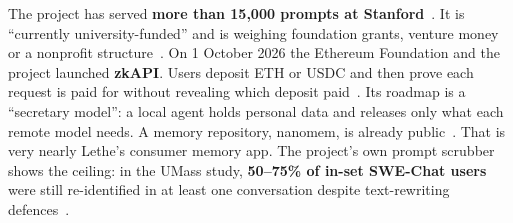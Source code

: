 \documentclass[10pt,a4paper]{article}
\begin{document}
The project has served \textbf{more than 15,000 prompts at Stanford}~\cite{ken-liu-on-x}. It is ``currently university-funded'' and is weighing foundation grants, venture money or a nonprofit structure~\cite{brave-technologist-podcast}. On 1 October 2026 the Ethereum Foundation and the project launched \textbf{zkAPI}. Users deposit ETH or USDC and then prove each request is paid for without revealing which deposit paid~\cite{the-block-zkapi-launch}. Its roadmap is a ``secretary model'': a local agent holds personal data and releases only what each remote model needs. A memory repository, nanomem, is already public~\cite{brave-technologist-podcast,openanonymity-on-github}. That is very nearly Lethe's consumer memory app. The project's own prompt scrubber shows the ceiling: in the UMass study, \textbf{50--75\% of in-set SWE-Chat users} were still re-identified in at least one conversation despite text-rewriting defences~\cite{arxiv-2609-33903-umass}.
\end{document}
